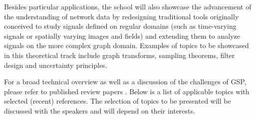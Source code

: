 \documentclass[a4paper]{scrartcl}
\begin{document}
Besides particular applications, the school will also showcase the advancement
of the understanding of network data by redesigning traditional tools originally
conceived to study signals defined on regular domains (such as time-varying
signals or spatially varying images and fields) and extending them to analyze
signals on the more complex graph domain. Examples of topics to be showcased in
this theoretical track include graph transforms, sampling theorems, filter
design and uncertainty principles.

For a broad technical overview as well as a discussion of the challenges of GSP,
please refer to published review papers \cite{shuman_emerging_2013,
sandryhaila_discrete_2014, coifman_diffusion_2006, ekambaram_circulant_2013}.
Below is a list of applicable topics with selected (recent) references. The
selection of topics to be presented will be discussed with the speakers and will
depend on their interests.
\end{document}
